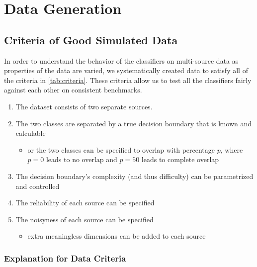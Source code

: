 \documentclass{article}
\begin{document}
\section*{Data Generation}

\subsection*{Criteria of Good Simulated Data}

In order to understand the behavior of the classifiers on multi-source data as
properties of the data are varied, we systematically created data to satisfy
all of the criteria in \ref{tab:criteria}.  These criteria allow us to test all
the classifiers fairly against each other on consistent benchmarks.

\begin{minipage}{\textwidth}
\centering
\begin{enumerate}
    \item The dataset consists of two separate sources.
    \item \label{itm:separable} The two classes are separated by a true
        decision boundary that is known and calculable
    \begin{itemize}
        \item or the two classes can be specified to overlap with percentage
            $p$, where $p=0$ leads to no overlap and $p=50$ leads to complete
            overlap
    \end{itemize}
    \item The decision boundary's complexity (and thus difficulty) can be
        parametrized and controlled
    \item The reliability of each source can be specified
    \item The noisyness of each source can be specified
    \begin{itemize}
        \item \label{itm:noise_dims} extra meaningless dimensions can be
            added to each source
    \end{itemize}
\end{enumerate}
\label{tab:criteria}
\end{minipage}

\subsubsection*{Explanation for Data Criteria}
\end{document}
